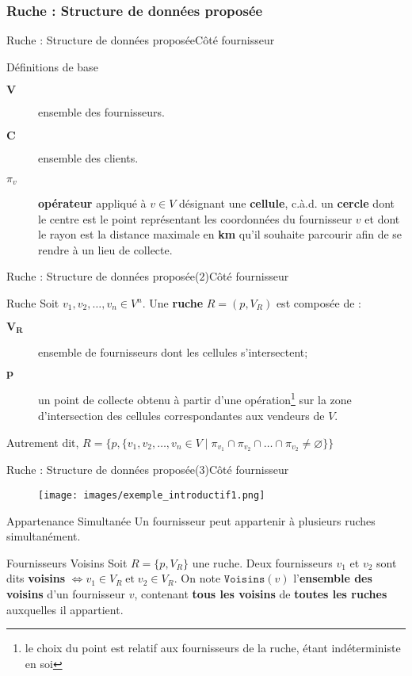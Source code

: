 \documentclass[usenames,dvipsnames]{beamer}
\begin{document}
\subsubsection*{Ruche : Structure de données proposée}
\begin{frame}{Ruche : Structure de données proposée}{Côté fournisseur}
\begin{block}{Définitions de base}
\begin{description}
  \item[$\textbf{V}$]{ensemble des fournisseurs.}
  \item[$\textbf{C}$]{ensemble des clients.}
  \item[$\pi_v$]{\textbf{opérateur} appliqué à $v \in V$ désignant une \textbf{cellule}, c.à.d. un \textbf{cercle} dont le centre est le point représentant les coordonnées du fournisseur $v$ et dont le rayon est la distance maximale en \textbf{km} qu'il souhaite parcourir afin de se rendre à un lieu de collecte.}
\end{description}
\end{block}
\end{frame}

\begin{frame}{Ruche : Structure de données proposée($2$)}{Côté fournisseur}
\begin{block}{Ruche}
Soit $v_1, v_2, \dots, v_n \in V^n$. Une \textbf{ruche} $R = (p, V_R)$ est composée de :
\begin{description}
  \item[$\mathbf{V_R}$]{ensemble de fournisseurs dont les cellules s'intersectent;}
  \item[$\mathbf{p}$]{un point de collecte obtenu à partir d'une opération\footnote{le choix du point est relatif aux fournisseurs de la ruche, étant indéterministe en soi} sur la zone d'intersection des cellules correspondantes aux vendeurs de $V$.}
\end{description}
Autrement dit, $R = \{p, \{v_1, v_2, \dots, v_n \in V\; |\; \pi_{v_1} \cap \pi_{v_2} \cap \dots \cap \pi_{v_2} \neq \varnothing\}\}$
\end{block}
\end{frame}

\begin{frame}{Ruche : Structure de données proposée($3$)}{Côté fournisseur}
\begin{figure}[!ht]
  \centering
  \texttt{[image: images/exemple\_introductif1.png]}
\end{figure}

\begin{block}{Appartenance Simultanée}
Un fournisseur peut appartenir à plusieurs ruches simultanément.
\end{block}

\begin{block}{Fournisseurs Voisins}
Soit $R = \{p, V_R\}$ une ruche. Deux fournisseurs $v_1$ et $v_2$ sont dits \textbf{voisins} $\iff v_1 \in V_R\; \text{et}\; v_2 \in V_R$. On note $\texttt{Voisins}(v)$ l'\textbf{ensemble des voisins} d'un fournisseur $v$, contenant \textbf{tous les voisins} de \textbf{toutes les ruches} auxquelles il appartient.
\end{block}
\end{frame}
\end{document}

